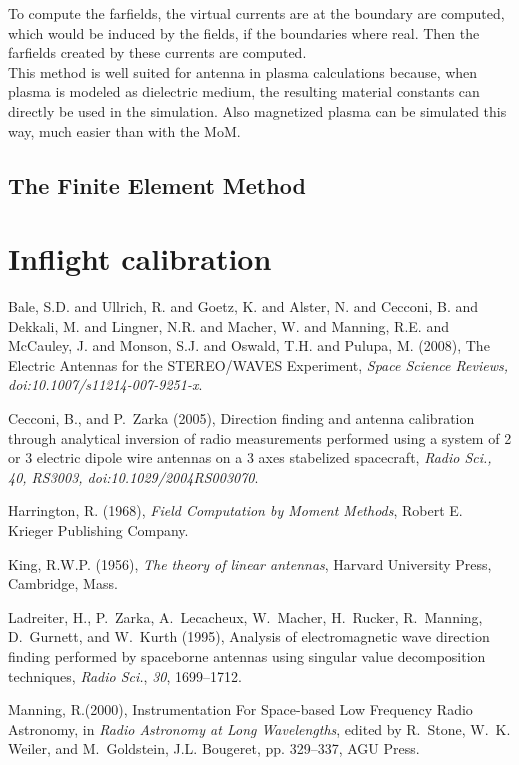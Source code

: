\documentclass[a4paper,11pt]{report}
\begin{document}
To compute the farfields, the virtual currents are at the boundary are computed, which would be induced by the fields, if the boundaries where real. Then the farfields created by these currents are computed.\\

This method is well suited for antenna in plasma calculations because, when plasma is modeled as dielectric medium, the resulting material constants can directly be used in the simulation. Also magnetized plasma can be simulated this way, much easier than with the MoM.

\subsection{The Finite Element Method}
\section{Inflight calibration}

\begin{thebibliography}{}


Bale, S.D. and Ullrich, R. and Goetz, K. and Alster, N. and Cecconi, B. and Dekkali, M. and Lingner, N.R. and Macher, W. and Manning, R.E. and McCauley, J. and Monson, S.J. and Oswald, T.H. and Pulupa, M. (2008), The Electric Antennas for the STEREO/WAVES Experiment, \textit{Space Science Reviews,
doi:10.1007/s11214-007-9251-x}.

Cecconi, B., and P.~Zarka (2005), Direction finding and antenna calibration
  through analytical inversion of radio measurements performed using a system
  of 2 or 3 electric dipole wire antennas on a 3 axes stabelized spacecraft,
  \textit{Radio Sci., 40, RS3003, doi:10.1029/2004RS003070}.

Harrington, R. (1968), \textit{Field Computation by Moment Methods}, Robert E.
  Krieger Publishing Company.

King, R.W.P. (1956), \textit{The theory of linear antennas}, Harvard University Press, Cambridge, Mass.
 

Ladreiter, H., P.~Zarka, A.~Lecacheux, W.~Macher, H.~Rucker, R.~Manning,
  D.~Gurnett, and W.~Kurth (1995), Analysis of electromagnetic wave direction
  finding performed by spaceborne antennas using singular value decomposition
  techniques, \textit{Radio Sci.}, \textit{30}, 1699--1712.

Manning, R.(2000), Instrumentation For Space-based Low Frequency Radio Astronomy, in \textit{Radio Astronomy at Long Wavelengths}, edited by R.~Stone, W.~K. Weiler, and M.~Goldstein, J.L. Bougeret, pp.
  329--337, AGU Press.

\end{thebibliography}
\end{document}
